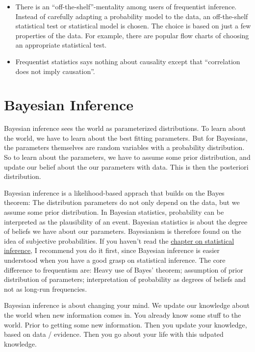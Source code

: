 \documentclass[
  10pt,
]{scrbook}
\begin{document}
\begin{itemize}
\item
  There is an ``off-the-shelf''-mentality among users of frequentist inference. Instead of carefully adapting a probability model to the data, an off-the-shelf statistical test or statistical model is chosen. The choice is based on just a few properties of the data. For example, there are popular flow charts of choosing an appropriate statistical test.
\item
  Frequentist statistics says nothing about causality except that ``correlation does not imply causation''.
\end{itemize}

\hypertarget{bayesian}{%
\chapter{Bayesian Inference}\label{bayesian}}

Bayesian inference sees the world as parameterized distributions.
To learn about the world, we have to learn about the best fitting parameters.
But for Bayesians, the parameters themselves are random variables with a probability distribution.
So to learn about the parameters, we have to assume some prior distribution, and update our belief about the our parameters with data.
This is then the posteriori distribution.

Bayesian inference is a likelihood-based apprach that builds on the Bayes theorem:
The distribution parameters do not only depend on the data, but we assume some prior distribution.
In Bayesian statistics, probability can be interpreted as the plausibility of an event.
Bayesian statistics is about the degree of beliefs we have about our parameters.
Bayesianism is therefore found on the idea of subjective probabilities.
If you haven't read the \protect\hyperlink{statistical-inference}{chapter on statistical inference}, I recommend you do it first, since Bayesian inference is easier understood when you have a good grasp on statistical inference.
The core difference to frequentism are: Heavy use of Bayes' theorem; assumption of prior distribution of parameters; interpretation of probability as degrees of beliefs and not as long-run frequencies.

Bayesian inference is about changing your mind.
We update our knowledge about the world when new information comes in.
You already know some stuff to the world.
Prior to getting some new information.
Then you update your knowledge, based on data / evidence.
Then you go about your life with this udpated knowledge.
\end{document}
